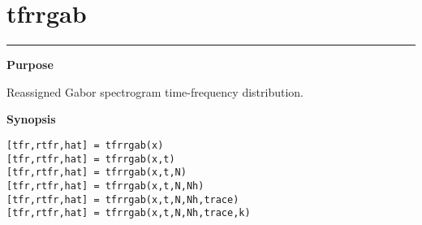 

\section*{\hspace*{-1.6cm} tfrrgab}

\vspace*{-.4cm}
\hspace*{-1.6cm}\rule[0in]{16.5cm}{.02cm}
\vspace*{.2cm}

{\bf \large \sf Purpose}\\
\hspace*{1.5cm}
\begin{minipage}[t]{13.5cm}
Reassigned Gabor spectrogram time-frequency distribution.
\end{minipage}
\vspace*{.5cm}

{\bf \large \sf Synopsis}\\
\hspace*{1.5cm}
\begin{minipage}[t]{13.5cm}
\begin{verbatim}
[tfr,rtfr,hat] = tfrrgab(x) 
[tfr,rtfr,hat] = tfrrgab(x,t) 
[tfr,rtfr,hat] = tfrrgab(x,t,N) 
[tfr,rtfr,hat] = tfrrgab(x,t,N,Nh) 
[tfr,rtfr,hat] = tfrrgab(x,t,N,Nh,trace) 
[tfr,rtfr,hat] = tfrrgab(x,t,N,Nh,trace,k) 
\end{verbatim}
\end{minipage}
\vspace*{.5cm}


